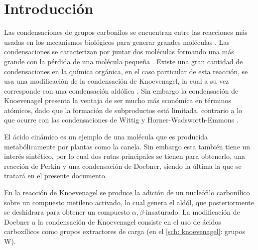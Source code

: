 \documentclass[fleqn,11pt]{SelfArx}
\begin{document}
\flushbottom %

\maketitle %


\thispagestyle{empty} %
\renewcommand{\tablename}{Tabla} 



\section*{Introducci\'on} %
Las condensaciones de grupos carbonilos se encuentran entre las reacciones más usadas en los mecanismos biológicos para generar grandes moléculas \cite{Wade2013}. Las condensaciones se caracterizan por juntar dos moléculas formando una más grande con la pérdida de una molécula pequeña \cite{Wade2013}. Existe una gran cantidad de condensaciones en la química orgánica, en el caso particular de esta reacción, se usa una modificación de la condensación de Knoevenagel, la cual a su vez corresponde con una condensación aldólica \cite{Palomo2004, List2005}. Sin embargo la condensación de Knoevenagel presenta la ventaja de ser mucho más económica en términos atómicos, dado que la formación de subproductos está limitada, contrario a lo que ocurre con las condensaciones de Wittig y Horner-Wadsworth-Emmons  \cite{List2005}.

El ácido cinámico es un ejemplo de una molécula que es producida metabólicamente por plantas como la canela. Sin embargo esta también tiene un interés sintético, por lo cual dos rutas principales se tienen para obtenerlo, una reacción de Perkin y una condensación de Doebner, siendo la última la que se tratará en el presente documento.

En la reacción de Knoevenagel se produce la adición de un nucleófilo carbonílico sobre un compuesto metileno activado, lo cual genera el aldól, que posteriormente se deshidrara para obtener un compuesto $\alpha,\beta$-insaturado. La modificación de Doebner a la condensación de Knoevenagel consiste en el uso de ácidos carboxílicos como grupos extractores de carga (en el \autoref{sch: knoevenagel}: grupos W). 
\end{document}
